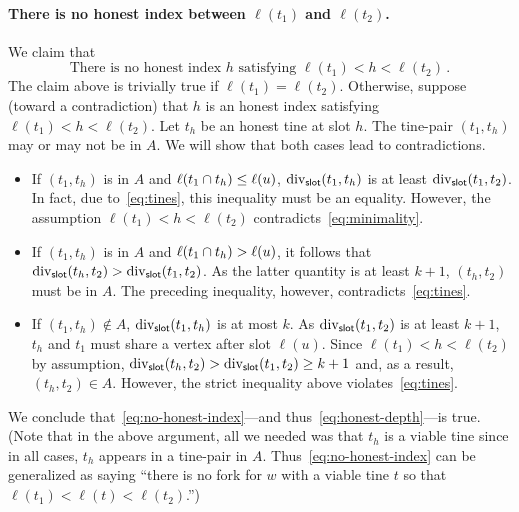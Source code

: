     \paragraph{There is no honest index between $\ell(t_1)$ and $\ell(t_2)$.}
    We claim that 
    \begin{equation}\label{eq:no-honest-index}
        \text{There is no honest index $h$ satisfying $\ell(t_1) < h < \ell(t_2)$}
        \,.
    \end{equation}
    The claim above is trivially true if $\ell(t_1) = \ell(t_2)$.
    Otherwise, suppose (toward a contradiction) 
    that $h$ is an honest index satisfying $\ell(t_1) < h < \ell(t_2)$. 
    Let $t_h$ be an honest tine at slot $h$. 
    The tine-pair $(t_1, t_h)$ may or may not be in $A$. 
    We will show that both cases lead to contradictions.
    \begin{itemize}
      \item If $(t_1, t_h)$ is in $A$ and $\ell(t_1 \cap t_h) \leq \ell(u)$, 
      $\mathrm{div}_{\mathsf{slot}}(t_1, t_h)$ is at least $\mathrm{div}_{\mathsf{slot}}(t_1, t_2)$. 
      In fact, due to~\eqref{eq:tines}, this inequality must be an equality. 
      However, the assumption $\ell(t_1) < h < \ell(t_2)$ contradicts~\eqref{eq:minimality}. 

      \item If $(t_1, t_h)$ is in $A$ and $\ell(t_1 \cap t_h) > \ell(u)$, 
      it follows that $\mathrm{div}_{\mathsf{slot}}(t_h, t_2) > \mathrm{div}_{\mathsf{slot}}(t_1, t_2)$. 
      As the latter quantity is at least $k + 1$, $(t_h, t_2)$ must be in $A$. 
      The preceding inequality, however, contradicts~\eqref{eq:tines}.

      \item If $(t_1, t_h) \not \in A$, 
      $\mathrm{div}_{\mathsf{slot}}(t_1, t_h)$ is at most $k$.
      As $\mathrm{div}_{\mathsf{slot}}(t_1, t_2)$ is at least $k + 1$, 
      $t_h$ and $t_1$ must share a vertex after slot $\ell(u)$. 
      Since $\ell(t_1) < h < \ell(t_2)$ by assumption, 
      $\mathrm{div}_{\mathsf{slot}}(t_h, t_2) > \mathrm{div}_{\mathsf{slot}}(t_1, t_2) \geq k + 1$ 
      and, as a result, $(t_h, t_2) \in A$. 
      However, the strict inequality above violates~\eqref{eq:tines}. 
    \end{itemize}
    We conclude that~\eqref{eq:no-honest-index}---and thus~\eqref{eq:honest-depth}---is true. 
    (Note that in the above argument, all we needed was that $t_h$ is a viable tine 
    since in all cases, $t_h$ appears in a tine-pair in $A$. 
    Thus~\eqref{eq:no-honest-index} can be generalized as saying 
    ``there is no fork for $w$ with a viable tine $t$ so that $\ell(t_1) < \ell(t) < \ell(t_2)$.'')
    


